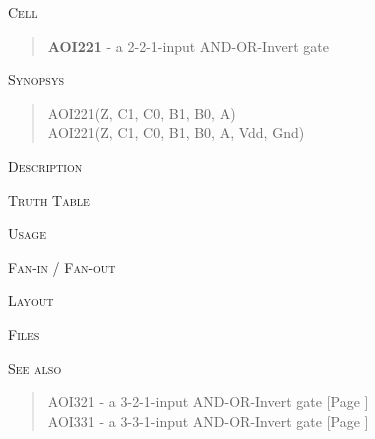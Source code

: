 
\label{AOI221}
\textsc{Cell}
\begin{quote}
    \textbf{AOI221} - a 2-2-1-input AND-OR-Invert gate
\end{quote}

\textsc{Synopsys}
\begin{quote}
    AOI221(Z, C1, C0, B1, B0, A) \\
    AOI221(Z, C1, C0, B1, B0, A, Vdd, Gnd)
\end{quote}

\textsc{Description}

%

\textsc{Truth Table}


\textsc{Usage}

\textsc{Fan-in / Fan-out}

\textsc{Layout}

\textsc{Files}

\textsc{See also}
\begin{quote}
    AOI321 - a 3-2-1-input AND-OR-Invert gate [Page \pageref{AOI321}] \\
    AOI331 - a 3-3-1-input AND-OR-Invert gate [Page \pageref{AOI331}]
\end{quote}

